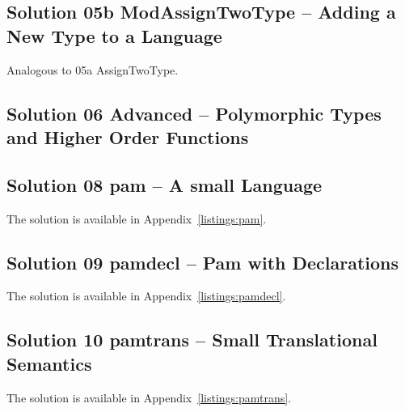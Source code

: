 \documentclass[10.5pt,a4]{article}
\begin{document}
\subsection{Solution 05b ModAssignTwoType – Adding a New Type to a Language}
Analogous to 05a AssignTwoType.

\subsection{Solution 06 Advanced – Polymorphic Types and Higher Order Functions}


\subsection{Solution 08 pam – A small Language}
The solution is available in Appendix~\ref{listings:pam}.

\subsection{Solution 09 pamdecl – Pam with Declarations}
The solution is available in Appendix~\ref{listings:pamdecl}.

\subsection{Solution 10 pamtrans – Small Translational Semantics}
The solution is available in Appendix~\ref{listings:pamtrans}.

\end{document}
